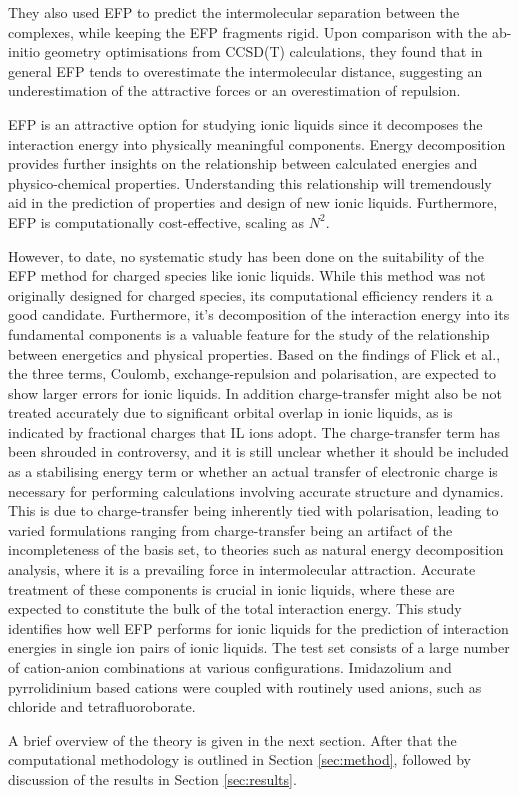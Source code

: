 They also used EFP to predict the intermolecular separation between the complexes, while keeping the EFP fragments rigid.
Upon comparison with the ab-initio geometry optimisations from CCSD(T) calculations, they found that in general EFP tends to overestimate the intermolecular distance, suggesting an underestimation of the attractive forces or an overestimation of repulsion.



EFP is an attractive option for studying ionic liquids since it decomposes the interaction energy into physically meaningful components.
Energy decomposition provides further insights on the relationship between calculated energies and physico-chemical properties.
Understanding this relationship will tremendously aid in the prediction of properties and design of new ionic liquids.
Furthermore, EFP is computationally cost-effective, scaling as $N^2$.
\cite{Flick2012a}


However, to date, no systematic study has been done on the suitability of the EFP method for charged species like ionic liquids. 
While this method was not originally designed for charged species, its computational efficiency renders it a good candidate. 
Furthermore, it's decomposition of the interaction energy into its fundamental components is a valuable feature for the study of the relationship between energetics and physical properties. 
Based on the findings of Flick et al., the three terms, Coulomb, exchange-repulsion and polarisation, are expected to show larger errors for ionic liquids. 
In addition charge-transfer might also be not treated accurately due to significant orbital overlap in ionic liquids, as is indicated by fractional charges that IL ions adopt.
\cite{Schmidt2010a, Dommert2012a, Dommert2014a, Rigby2013a, Wendler2012a}
The charge-transfer term has been shrouded in controversy, and it is still unclear whether it should be included as a stabilising energy term or whether an actual transfer of electronic charge is necessary for performing calculations involving accurate structure and dynamics.
\cite{Ramesh2008a, Robertson2002a, Thompson2000a, Lee2011a, Piquemal2006a, Kumar2011a}
This is due to charge-transfer being inherently tied with polarisation, leading to varied formulations ranging from charge-transfer being an artifact of the incompleteness of the basis set, to theories such as natural energy decomposition analysis,
\cite{Schenter1996a, Glendening2005a}
where it is a prevailing force in intermolecular attraction.
Accurate treatment of these components is crucial in ionic liquids, where these are expected to constitute the bulk of the total interaction energy.
This study identifies how well EFP performs for ionic liquids for the prediction of interaction energies in single ion pairs of ionic liquids.
The test set consists of a large number of cation-anion combinations at various configurations.
Imidazolium and pyrrolidinium based cations were coupled with routinely used anions, such as chloride and tetrafluoroborate.


A brief overview of the theory is given in the next section. 
After that the computational methodology is outlined in Section \ref{sec:method}, followed by discussion of the results in Section \ref{sec:results}.
